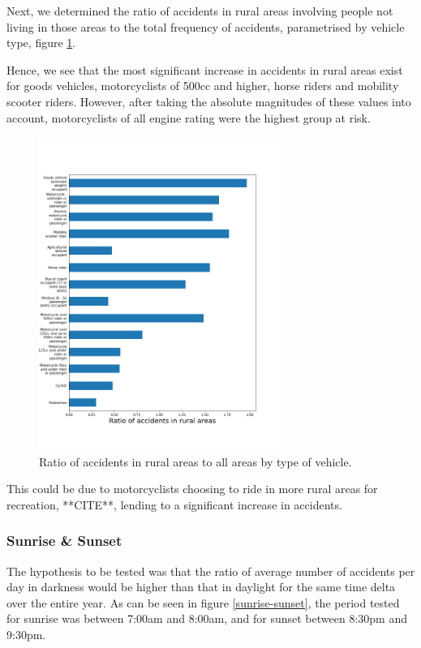 \documentclass[12pt]{article}
\begin{document}
Next, we determined the ratio of accidents in rural areas involving people not living in those areas to the total frequency of accidents, parametrised by vehicle type, figure \ref{vehicle-rural}.

Hence, we see that the most significant increase in accidents in rural areas exist for goods vehicles, motorcyclists of 500cc and higher, horse riders and mobility scooter riders. However, after taking the absolute magnitudes of these values into account, motorcyclists of all engine rating were the highest group at risk.

\newpage

\begin{figure}[h]
\centering     %
\includegraphics[width=0.70\textwidth]{casualty_rural}
\caption{Ratio of accidents in rural areas to all areas by type of vehicle.}
\label{vehicle-rural}
\end{figure}


This could be due to motorcyclists choosing to ride in more rural areas for recreation, **CITE**, lending to a significant increase in accidents.

\newpage

\subsubsection{Sunrise \& Sunset}

The hypothesis to be tested was that the ratio of average number of accidents per day in darkness would be higher than that in daylight for the same time delta over the entire year. 
As can be seen in figure \ref{sunrise-sunset}, the period tested for sunrise was between 7:00am and 8:00am, and for sunset between 8:30pm and 9:30pm.
\end{document}
